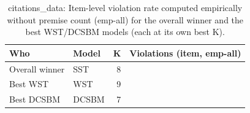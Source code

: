 \begin{table}[!h]
\centering
\caption{citations_data: Item-level violation rate computed empirically without premise count (emp-all) for the overall winner and the best WST/DCSBM models (each at its own best K).\\\label{tab:app-citations_data-best-item-empall}}
\centering
\begin{tabular}[t]{llrr}
\toprule
Who & Model & K & Violations (item, emp-all)\\
\midrule
Overall winner & SST & 8 & \\
Best WST & WST & 9 & \\
Best DCSBM & DCSBM & 7 & \\
\bottomrule
\end{tabular}
\end{table}
